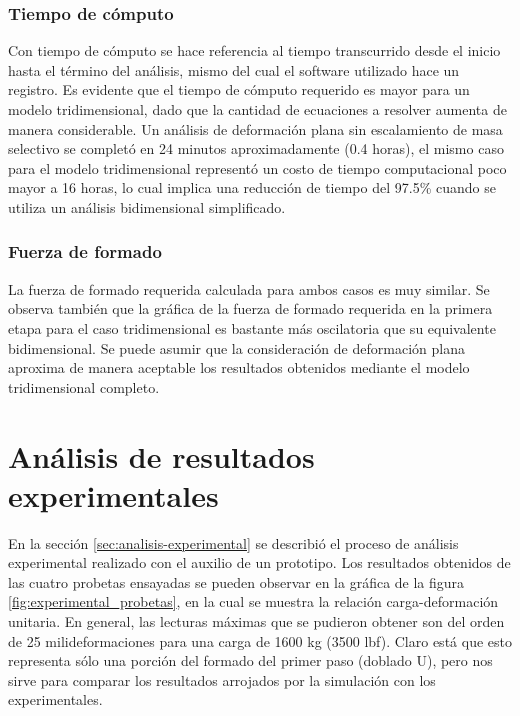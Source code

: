 \subsubsection{Tiempo de cómputo}

Con tiempo de cómputo se hace referencia al tiempo transcurrido desde el inicio hasta el 
término del análisis, mismo del cual el software utilizado hace un registro. 
Es evidente que el tiempo de cómputo requerido es mayor para un modelo tridimensional, dado 
que la cantidad de ecuaciones a resolver aumenta de manera considerable.
Un análisis de deformación plana sin escalamiento de masa selectivo se completó en 24 minutos 
aproximadamente (0.4 horas), el mismo caso para el modelo tridimensional representó 
un costo de tiempo computacional poco mayor a 16 horas, lo cual implica una reducción de tiempo 
del 97.5\% cuando se utiliza un análisis bidimensional simplificado.

\subsubsection{Fuerza de formado}

La fuerza de formado requerida calculada para ambos casos es muy similar. Se observa también 
que la gráfica de la fuerza de formado requerida en la primera etapa para el caso tridimensional 
es bastante más oscilatoria que su equivalente bidimensional. 
Se puede asumir que la consideración de deformación plana aproxima de manera aceptable 
los resultados obtenidos mediante el modelo tridimensional completo.

\section{Análisis de resultados experimentales }

En la sección \ref{sec:analisis-experimental} se describió el proceso de análisis experimental 
realizado con el auxilio de un prototipo. Los resultados obtenidos de las cuatro probetas 
ensayadas se pueden observar en la gráfica de la figura \ref{fig:experimental_probetas}, en 
la cual se muestra la relación carga-deformación unitaria. 
En general, las lecturas máximas que se pudieron obtener son del orden de 25 milideformaciones 
para una carga de 1600 kg (3500 lbf). Claro está que esto representa sólo una porción del formado del primer 
paso (doblado U), pero nos sirve para comparar los resultados arrojados por la simulación con 
los experimentales.\\

